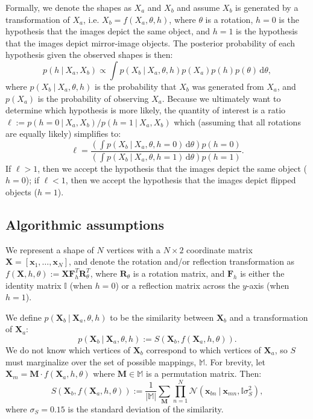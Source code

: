\documentclass[10pt,letterpaper]{article}
\newcommand{\Xa}[0]{\mathbf{X}_a}
\newcommand{\Xb}[0]{\mathbf{X}_b}
\newcommand{\R}[0]{\mathbf{R}_\theta}
\newcommand{\F}[0]{\mathbf{F}}
\newcommand{\M}[0]{\mathbf{M}}
\newcommand{\I}[0]{\mathbb{I}}
\newcommand{\hi}[0]{h=0}
\newcommand{\hf}[0]{h=1}
\newcommand{\dif}[0]{\,\mathrm{d}}
\begin{document}
Formally, we denote the shapes as $X_a$ and $X_b$ and assume $X_b$ is
generated by a transformation of $X_a$, i.e. $X_b=f(X_a, \theta, h)$,
where $\theta$ is a rotation, $\hi$ is the hypothesis that the images
depict the same object, and $\hf$ is the hypothesis that the images
depict mirror-image objects. The posterior probability of each
hypothesis given the observed shapes is then:
\begin{equation}
  p(h\ \vert\ X_a, X_b) \propto \int p(X_b\ \vert\ X_a, \theta, h)p(X_a)p(h)p(\theta)\dif\theta,
  \label{eq:posterior}
\end{equation}
where $p(X_b\ \vert\ X_a, \theta, h)$ is the probability that $X_b$
was generated from $X_a$, and $p(X_a)$ is the probability of observing
$X_a$. Because we ultimately want to determine which hypothesis is
more likely, the quantity of interest is a ratio $\ell:=p(\hi\ \vert\
X_a, X_b) / p(\hf\ \vert\ X_a, X_b)$ which (assuming that all
rotations are equally likely) simplifies to:
\begin{equation}
  \ell = \frac{\left(\int p(X_b\ \vert\ X_a, \theta, \hi)\dif\theta\right)p(\hi)}{\left(\int p(X_b\ \vert\ X_a, \theta, \hf)\dif\theta\right)p(\hf)}.
  \label{eq:lh-ratio}
\end{equation}
If $\ell > 1$, then we accept the hypothesis that the images depict
the same object ($\hi$); if $\ell < 1$, then we accept the hypothesis
that the images depict flipped objects ($\hf$).

\subsection{Algorithmic assumptions}

We represent a shape of $N$ vertices with a $N\times 2$ coordinate
matrix $\mathbf{X}=[\mathbf{x}_1, \ldots{}, \mathbf{x}_N]$, and denote
the rotation and/or reflection transformation as $f(\mathbf{X}, h,
\theta):=\mathbf{X}\F_h^T\R^T$, where $\R$ is a rotation matrix, and
$\F_h$ is either the identity matrix $\I$ (when $\hi$) or a reflection
matrix across the $y$-axis (when $\hf$).

We define $p(\Xb\ \vert\ \Xa, \theta, h)$ to be the similarity between
$\Xb$ and a transformation of $\Xa$:
\begin{equation}
  p(\Xb\ \vert\ \Xa, \theta, h):= S(\Xb, f(\Xa, h, \theta)).
  \label{eq:likelihood}
\end{equation}
We do not know which vertices of $\Xb$ correspond to which vertices of
$\Xa$, so $S$ must marginalize over the set of possible mappings,
$\mathbb{M}$. For brevity, let $\mathbf{X}_m=\M\cdot{}f(\Xa, h,
\theta)$ where $\M\in\mathbb{M}$ is a permutation matrix. Then:
\begin{equation}
  S(\Xb, f(\Xa, h, \theta)):=\frac{1}{|\mathbb{M}|} \sum_{\M} \prod_{n=1}^N \mathcal{N}(\mathbf{x}_{bn}\ \vert \ \mathbf{x}_{mn}, \I\sigma_S^2),
  \label{eq:similarity}
\end{equation}
where $\sigma_S=0.15$ is the standard deviation of the similarity.
\end{document}
